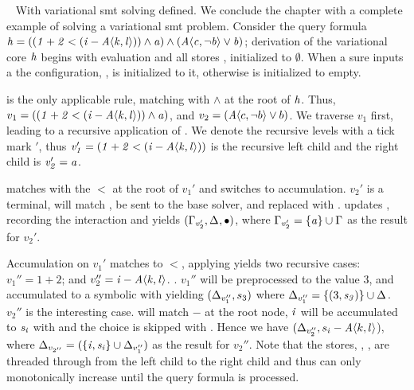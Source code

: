 ~\label{section:vsmt:example}
%
With variational \ac{smt} solving defined. We conclude the chapter with a
complete example of solving a variational \ac{smt} problem. Consider the query
formula $\kf{h = ((1 + 2 < (i - \chc[A]{k,l})) \wedge a) \wedge (\chc[A]{c,\neg
    b} \vee b)}$; derivation of the variational core $\mathit{h}$ begins with
evaluation and all stores \aStore{}, \eStore{} initialized to $\emptyset$. When a sure
inputs a \vc{} the configuration, \configuration{}, is initialized to it,
otherwise \configuration{} is initialized to empty.

 is the only applicable rule, matching \boolFuncs{} with $\wedge$
at the root of $\mathit{h}$. Thus, $v_{1} = \kf{((1 + 2 < (i -
  \chc[A]{k,l})) \wedge a)}$, and $v_{2} = (\chc[A]{c,\neg b} \vee b)$. We
traverse $v_{1}$ first, leading to a recursive application of .
We denote the recursive levels with a tick mark $'$, thus \newline{} $\kf{v_{1}' = (1 + 2 <
  (i - \chc[A]{k,l}))}$ is the recursive left child and the right child is
$\mathit{v_{2}' = a}$.

 matches \inequalities{}with the $<$ at the root of $v_{1}'$ and
switches to accumulation. $v_{2}'$ is a terminal, will match , be
sent to the base solver, and replaced with \unit{}.  updates
\eStore{}, recording the interaction and yields $(\Gamma_{v_{2}'},\Delta_{},
\bullet{}{})$, where $\Gamma_{v_{2}'} = \{\mathit{a}\} \cup \Gamma_{}$ as the result for
$v_{2}'$.

Accumulation on $v_{1}'$ matches \inequalities{} to $<$, applying
 yields two recursive cases: $v_{1}'' = 1 + 2$; and $v_{2}'' =
\kf{i - \chc[A]{k,l}}$. .
%
$v_{1}''$ will be preprocessed to the value 3, and accumulated to a symbolic with
 yielding $(\Delta_{v_{1}''}, s_{3})$ where $\Delta_{v_{1}''} =
\{(3, \mathit{s_{3}})\} \cup \Delta_{}$. $v_{2}''$ is the interesting case.
 will match $-$ at the root node, $\mathit{i}$ will be accumulated
to $\mathit{s_{i}}$ with  and the choice is skipped with
. Hence we have $(\aStore{v_{2}''}, s_{i} - \chc[A]{k,l}$), where
$\Delta_{v_{2''}} = (\{\mathit{i, s_{i}}\} \cup \Delta_{v_{1}''})$ as the result for
$v_{2}''$. Note that the stores, \aStore{}, \eStore{}, are threaded through from the left
child to the right child and thus can only monotonically increase until the
query formula is processed.


